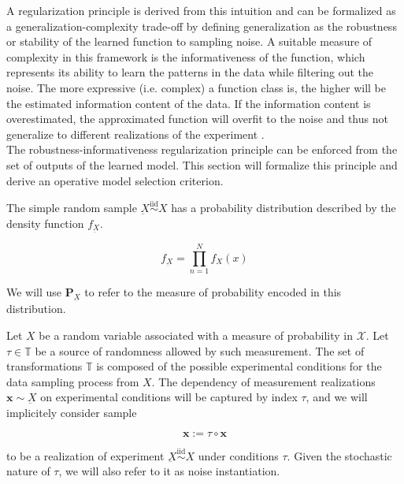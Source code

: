 A regularization principle is derived from this intuition and can be formalized as a
generalization-complexity trade-off by defining generalization as the robustness or stability
of the learned function to sampling noise. A suitable measure of complexity in this framework
is the informativeness of the function, which represents its ability to learn the patterns in the
data while filtering out the noise. The more expressive (i.e. complex) a function class is,
the higher will be the estimated information content of the data. If the information content is
overestimated, the approximated function will overfit to the noise and thus not generalize to
different realizations of the experiment
\cite{chehreghaniInformationTheoreticModel,buhmannInformationTheoreticModel,buhmannInformationTheoreticModel2010}. \\

The robustness-informativeness regularization principle can be enforced from the set 
of outputs of the learned model. This section will formalize this principle and derive an
operative model selection criterion.

\begin{definition}
    The simple random sample $\underbar{X} \overset{\text{iid}}{\sim} X$ has a probability distribution
    described by the density function $f_{\underbar{X}}$.

    $$
     f_{\underbar{X}} = \prod_{n=1}^{N} f_{X}(x)
    $$

    We will use $\mathbf{P}_{\underbar{X}}$ to refer to the measure of probability encoded in this distribution.
\end{definition}

\begin{definition}[Sample]
    Let $X$ be a random variable associated with a measure of probability
    in $\mathcal{X}$. 
    Let $\tau \in \mathbb{T}$ be a source of randomness allowed
    by such measurement.
    The set of transformations $\mathbb{T}$ is composed
    of the possible experimental conditions for the data sampling 
    process from $X$. The dependency of measurement 
    realizations $\bm{x} \sim \underbar{X}$ on experimental conditions 
    will be captured by index $\tau$, and we will implicitely consider sample
    
    $$
        \bm{x} := \tau \circ \bm{x}
    $$

    to be a realization of experiment $\underbar{X} \overset{\text{iid}}{\sim} X$ under conditions $\tau$. Given the stochastic
    nature of $\tau$, we will also refer to it as noise instantiation.
\end{definition}

